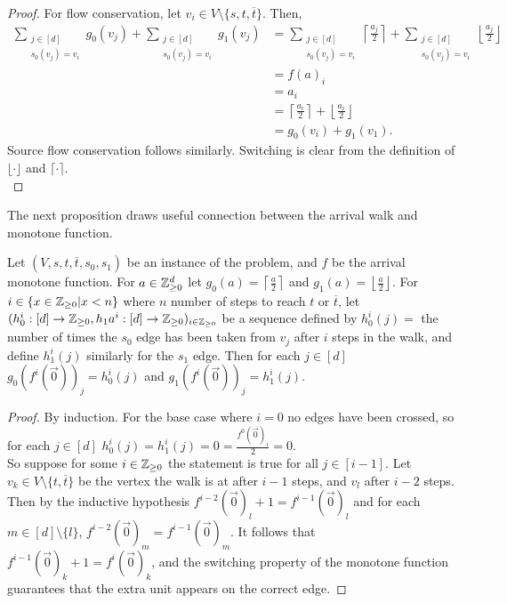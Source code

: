   \begin{proof}
    For flow conservation, let $v_i \in V \setminus \{s, t, \overline{t}\}$. Then,
    \begin{align*}
      \sum_{\substack{j \in [d] \\ s_0(v_j) = v_i}} g_0(v_j) 
      + \sum_{\substack{j \in [d] \\ s_0(v_j) = v_i}} g_1(v_j) &= 
      \sum_{\substack{j \in [d] \\ s_0(v_j) = v_i}}  \left\lceil \frac{a_j}{2} \right\rceil
      + \sum_{\substack{j \in [d] \\ s_0(v_j) = v_i}} \left\lfloor \frac{a_j}{2} \right\rfloor \\
      &= f(a)_i \\ 
      &= a_i \\ 
      &= \left\lceil \frac{a_i}{2}\right\rceil + \left\lfloor \frac{a_i}{2}\right\rfloor \\
      &= g_0(v_i) + g_1(v_1).
    \end{align*}
    Source flow conservation follows similarly. Switching is clear from the definition of $\lfloor \cdot \rfloor$
    and $\lceil \cdot \rceil$. \\
  \end{proof}
  The next proposition draws useful connection between the arrival walk and monotone function.
  \newcommand{\lc}{\left\lceil}
  \newcommand{\rc}{\right\rceil}
  \newcommand{\lf}{\left\lfloor}
  \newcommand{\rf}{\right\rfloor}
  \begin{prop}\label{kleeneTarskiIsWalk}
    Let $(V, s, t, \overline{t}, s_0, s_1)$ be an instance of the problem, and $f$ be the 
    arrival monotone function. For $a \in \mathbb{Z}_{\geq 0}^d$ let $g_0(a) = \lc \frac{a}{2} \rc$ and 
    $g_1(a) = \lf \frac{a}{2} \rf$. For $i \in \{x \in \mathbb{Z}_{\geq 0} | x < n \}$ where $n$ number of steps
    to reach $t$ or $\overline{t}$, let 
    $(h_0^i : [d] \to \mathbb{Z}_{\geq 0}, h_1a^i : [d] \to \mathbb{Z}_{\geq 0})_{i \in \mathbb{Z}_{\geq 0}}$
    be a sequence defined by $h_0^i(j) = $ the number of times the $s_0$ edge has been taken from $v_j$
    after $i$ steps in the walk, and define $h_1^i(j)$ similarly for the $s_1$ edge. Then for each $j \in [d]$
    $g_0(f^i(\vec{0}))_j = h_0^i(j)$ and $g_1(f^i(\vec{0}))_j = h_1^i(j)$.
  \end{prop}
  \begin{proof}
    By induction. For the base case where $i = 0$ no edges have been crossed, so for each
    $j \in [d]$ $h_0^i(j) = h_1^i(j) = 0 = \frac{f^0(\vec{0})_i}{2} = 0$. \\
    So suppose for some $i \in \mathbb{Z}_{\geq 0}$ the statement is true for all $j \in [i-1]$.
    Let $v_k \in V \setminus \{t, \overline{t}\}$ be the vertex the walk is at after $i - 1$ steps, and $v_l$ after $i-2$ steps.
    Then by the inductive hypothesis $f^{i-2}(\vec{0})_l + 1 = f^{i-1}(\vec{0})_l$ and for each
    $m \in [d] \setminus \{l\}$, $f^{i-2}(\vec{0})_m = f^{i-1}(\vec{0})_m$. It follows that
    $f^{i - 1}(\vec{0})_k + 1 = f^{i}(\vec{0})_k$, and the switching property of the monotone function
    guarantees that the extra unit appears on the correct edge.
  \end{proof}
